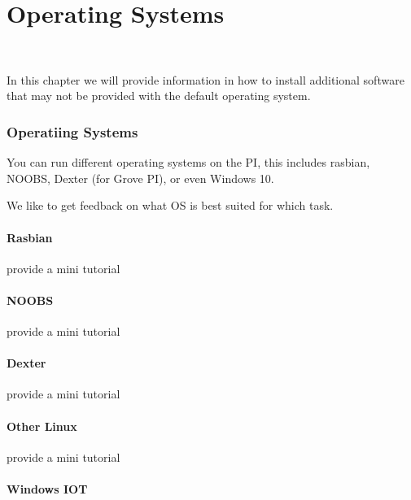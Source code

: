\chapter{Operating Systems}

\FILENAME\

In this chapter we will provide information in how to install additional 
software that may not be provided with the default operating system.

\subsection{Operatiing Systems}

You can run different operating systems on the PI, this includes 
rasbian, NOOBS, Dexter (for Grove PI), or even Windows 10.

We like to get feedback on what OS is best suited for which task.

\subsubsection{Rasbian}

\begin{exercise}
provide a mini tutorial 
\end{exercise}

\subsubsection{NOOBS}

\begin{exercise}
provide a mini tutorial 
\end{exercise}

\subsubsection{Dexter}

\begin{exercise}
provide a mini tutorial 
\end{exercise}

\subsubsection{Other Linux}

\begin{exercise}
provide a mini tutorial 
\end{exercise}

\subsubsection{Windows IOT}


